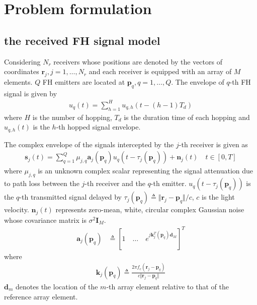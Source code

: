 \documentclass[journal,10pt]{IEEEtran}
\begin{document}
\section{Problem formulation}
\label{sec:model}

\subsection{the received FH signal model}
Considering $N_r$ receivers whose positions are denoted by the vectors of coordinates 
$\boldsymbol{r}_j,j=1,\dots,N_r$ and each receiver is equipped with an array of $M$ elements. $Q$ FH emitters are located at $\boldsymbol{p}_q,q=1,\dots,Q$. The envelope of $q$-th FH signal is given by
\begin{align}\label{eq:1}
    u_q(t)=\sum_{h=1}^H u_{q,h}(t-(h-1)T_d)
\end{align} 
where $H$ is the number of hopping, $T_d$ is the duration time of each hopping and $u_{q,h}(t)$ is the $h$-th hopped signal envelope.

The complex envelope of the signals intercepted by the $j$-th receiver is given as
\begin{align}\label{eq:2}
    \boldsymbol{s}_j(t)= \sum_{q=1}^{Q}\mu_{j,q} \boldsymbol{a}_j(\boldsymbol{p}_q)u_q(t-\tau_j(\boldsymbol{p}_q))+\boldsymbol{n}_j(t) \quad t\in [0,T]  
\end{align}
where $\mu_{j,q} $ is an unknown complex scalar representing the signal attenuation due to path loss between 
the $j$-th receiver and the $q$-th emitter. $u_q(t-\tau_j(\boldsymbol{p}_q))$ is the $q$-th transmitted signal delayed by $\tau_j(\boldsymbol{p}_q)\triangleq\Vert\boldsymbol{r}_j-\boldsymbol{p}_q\Vert/c$, $c$ is the light velocity.
$\boldsymbol{n}_j(t)$ represents zero-mean, white, circular complex Gaussian noise whose covariance matrix is $\sigma^2\boldsymbol{I}_M$. %
\begin{align}\label{eq:3}
    \boldsymbol{a}_j(\boldsymbol{p}_q)&\triangleq [1 \quad \dots \quad e^{j\boldsymbol{k}^T_j(\boldsymbol{p}_q)\boldsymbol{d}_M}]^T
\end{align} 
where 
\begin{align}\label{eq:4}
    \boldsymbol{k}_j(\boldsymbol{p}_q)\triangleq \frac{2\pi f_c(\boldsymbol{r}_j-\boldsymbol{p}_q) }{c\Vert\boldsymbol{r}_j-\boldsymbol{p}_q \Vert} 
\end{align} 
$\boldsymbol{d}_m$ denotes the location of the $m$-th array element relative to that of the reference array element.
\end{document}
